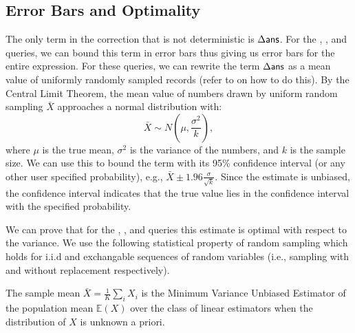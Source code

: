 \subsection{Error Bars and Optimality}\label{subsec:correct-practical}
The only term in the correction that is not deterministic is $\Delta\textsf{ans}$. 
For the \sumfunc, \countfunc, and \avgfunc queries, we can bound this term in error bars thus giving us error bars for the entire expression.
For these queries, we can rewrite the term $\Delta\textsf{ans}$ as a mean value of uniformly randomly sampled records (refer to \cite{wang1999sample} on how to do this).
By the Central Limit Theorem, the mean value of numbers drawn by uniform random sampling $\bar{X}$ approaches a normal distribution with:
\[
\bar{X} \sim N(\mu,\frac{\sigma^2}{k}),
\]
where $\mu$ is the true mean, $\sigma^2$ is the variance of the numbers, and $k$ is the sample size.
We can use this to bound the term with its 95\% confidence interval (or any other user specified probability), e.g., $\bar{X} \pm 1.96 \frac{\sigma}{\sqrt{k}}$.
Since the estimate is unbiased, the confidence interval indicates that the true value lies in the confidence interval with the specified probability.

We can prove that for the \sumfunc, \countfunc, and \avgfunc queries this estimate is optimal with respect to the variance.
We use the following statistical property of random sampling which holds for i.i.d and exchangable sequences of random variables (i.e., sampling with and without replacement respectively).
\begin{proposition}
The sample mean $\bar{X} = \frac{1}{K}\sum_i X_i$ is the Minimum Variance Unbiased Estimator of the population mean $\mathbb{E}(X)$ over the class of linear estimators when the distribution of $X$ is unknown a priori.
\end{proposition}

